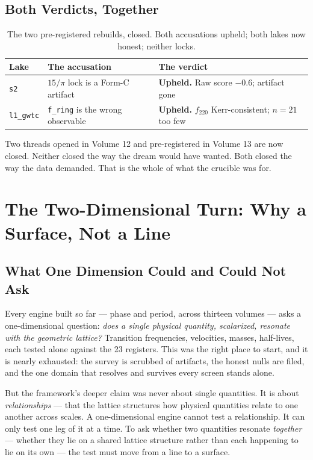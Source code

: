 \documentclass[11pt, letterpaper, openany]{book}
\begin{document}
\section{Both Verdicts, Together}

\begin{table}[H]
\centering
\small
\begin{tabular}{@{}lll@{}}
\toprule
\textbf{Lake} & \textbf{The accusation} & \textbf{The verdict} \\
\midrule
\texttt{s2} & $15/\pi$ lock is a Form-C artifact & \textbf{Upheld.} Raw score $-0.6$; artifact gone \\
\texttt{l1\_gwtc} & \texttt{f\_ring} is the wrong observable & \textbf{Upheld.} $f_{220}$ Kerr-consistent; $n{=}21$ too few \\
\bottomrule
\end{tabular}
\caption{The two pre-registered rebuilds, closed. Both accusations upheld; both lakes now
honest; neither locks.}
\end{table}

Two threads opened in Volume 12 and pre-registered in Volume 13 are now closed. Neither closed
the way the dream would have wanted. Both closed the way the data demanded. That is the whole of
what the crucible was for.

\chapter{The Two-Dimensional Turn: Why a Surface, Not a Line}

\section{What One Dimension Could and Could Not Ask}

Every engine built so far --- phase and period, across thirteen volumes --- asks a
one-dimensional question: \emph{does a single physical quantity, scalarized, resonate with the
geometric lattice?} Transition frequencies, velocities, masses, half-lives, each tested alone
against the 23 registers. This was the right place to start, and it is nearly exhausted: the
survey is scrubbed of artifacts, the honest nulls are filed, and the one domain that resolves and
survives every screen stands alone.

But the framework's deeper claim was never about single quantities. It is about
\emph{relationships} --- that the lattice structures how physical quantities relate to one
another across scales. A one-dimensional engine cannot test a relationship. It can only test one
leg of it at a time. To ask whether two quantities resonate \emph{together} --- whether they lie
on a shared lattice structure rather than each happening to lie on its own --- the test must move
from a line to a surface.
\end{document}
